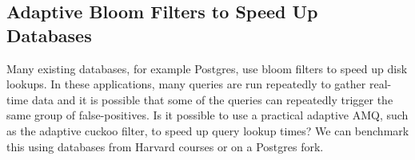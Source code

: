 \documentclass[../paper.tex]{subfiles}
\begin{document}

\subsection{Adaptive Bloom Filters to Speed Up Databases}
Many existing databases, for example Postgres, use bloom filters to speed up disk lookups. In these
applications, many queries are run repeatedly to gather real-time data and it is possible that
some of the queries can repeatedly trigger the same group of false-positives. Is it possible to use
a practical adaptive AMQ, such as the adaptive cuckoo filter, to speed up query lookup times? We can
benchmark this using databases from Harvard courses or on a Postgres fork.
\end{document}
